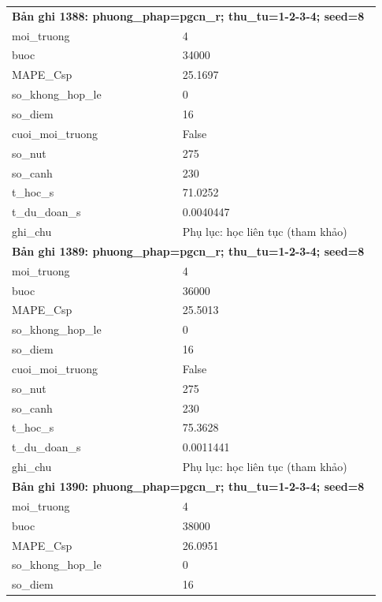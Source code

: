 \begin{longtable}{p{0.43\linewidth}p{0.50\linewidth}}
\midrule
\multicolumn{2}{p{0.95\linewidth}}{\textbf{Bản ghi 1388: phuong\_phap=pgcn\_r; thu\_tu=1-2-3-4; seed=8}} \\
moi\_\allowbreak truong & 4 \\
buoc & 34000 \\
MAPE\_\allowbreak Csp & 25.1697 \\
so\_\allowbreak khong\_\allowbreak hop\_\allowbreak le & 0 \\
so\_\allowbreak diem & 16 \\
cuoi\_\allowbreak moi\_\allowbreak truong & False \\
so\_\allowbreak nut & 275 \\
so\_\allowbreak canh & 230 \\
t\_\allowbreak hoc\_\allowbreak s & 71.0252 \\
t\_\allowbreak du\_\allowbreak doan\_\allowbreak s & 0.0040447 \\
ghi\_\allowbreak chu & Phụ lục: học liên tục (tham khảo) \\
\midrule
\multicolumn{2}{p{0.95\linewidth}}{\textbf{Bản ghi 1389: phuong\_phap=pgcn\_r; thu\_tu=1-2-3-4; seed=8}} \\
moi\_\allowbreak truong & 4 \\
buoc & 36000 \\
MAPE\_\allowbreak Csp & 25.5013 \\
so\_\allowbreak khong\_\allowbreak hop\_\allowbreak le & 0 \\
so\_\allowbreak diem & 16 \\
cuoi\_\allowbreak moi\_\allowbreak truong & False \\
so\_\allowbreak nut & 275 \\
so\_\allowbreak canh & 230 \\
t\_\allowbreak hoc\_\allowbreak s & 75.3628 \\
t\_\allowbreak du\_\allowbreak doan\_\allowbreak s & 0.0011441 \\
ghi\_\allowbreak chu & Phụ lục: học liên tục (tham khảo) \\
\midrule
\multicolumn{2}{p{0.95\linewidth}}{\textbf{Bản ghi 1390: phuong\_phap=pgcn\_r; thu\_tu=1-2-3-4; seed=8}} \\
moi\_\allowbreak truong & 4 \\
buoc & 38000 \\
MAPE\_\allowbreak Csp & 26.0951 \\
so\_\allowbreak khong\_\allowbreak hop\_\allowbreak le & 0 \\
so\_\allowbreak diem & 16 \\

\end{longtable}
